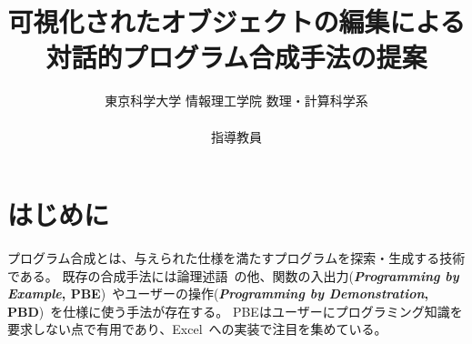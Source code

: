 \documentclass[11pt, a4paper, oneside, twocolumn]{jsarticle}
\title{%
可視化されたオブジェクトの編集による  \\
対話的プログラム合成手法\mysys{}の提案
}
\author{%
東京科学大学 情報理工学院 数理・計算科学系\\
\studentID \ 
\authorname \\
指導教員 \supervisor
}
\date{}
\begin{document}
\maketitle


\section{はじめに}


プログラム合成とは、与えられた仕様を満たすプログラムを探索・生成する技術である。
既存の合成手法には論理述語~\cite{first order,temporal logic}の他、関数の入出力(\textbf{\emph{Programming by Example}, PBE})~\cite{smallstep, escher}やユーザーの操作(\textbf{\emph{Programming by Demonstration}, PBD})~\cite{pbd}を仕様に使う手法が存在する。
PBEはユーザーにプログラミング知識を要求しない点で有用であり、Excel~\cite{flash fill}への実装で注目を集めている。

\end{document}

